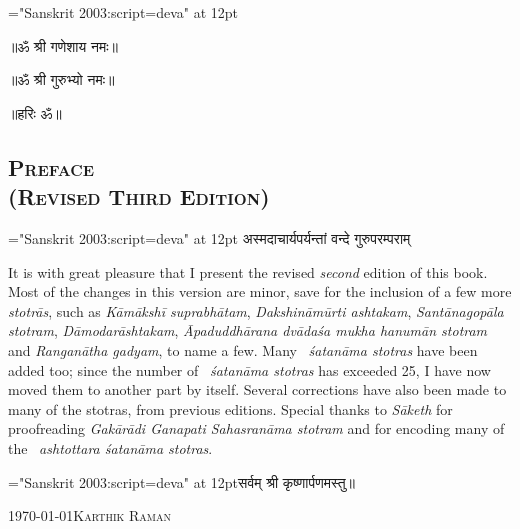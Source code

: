 {\font \x="Sanskrit 2003:script=deva" at 12pt\x
\centerline{॥ॐ श्री गणेशाय नमः॥}
\centerline{॥ॐ श्री गुरुभ्यो नमः॥}
\centerline{॥हरिः ॐ॥}
}
\thispagestyle{empty}

\begin{center}
\chapter*{\texorpdfstring{\scshape{Preface\\(Revised Third Edition)}}{Preface\\(Revised Third Edition)}}
\end{center}

{\font \x="Sanskrit 2003:script=deva" at 12pt\x
{}
{अस्मदाचार्यपर्यन्तां वन्दे गुरुपरम्पराम्}
}

It is with great pleasure that I present the revised \emph{second} edition of this book. Most of the changes in this version are minor, save for the inclusion of a few more \emph{stotrās}, such as \textit{Kāmākshī suprabhātam}, \textit{Dakshināmūrti ashtakam}, \textit{Santānagopāla stotram}, \textit{Dāmodarāshtakam}, \textit{Āpaduddhārana  dvādaśa mukha hanu\-mān stotram} and \textit{Ranganātha gadyam}, to name a few. Many ~\textit{śatanāma stotras} have been added too; since the number of ~\textit{śatanāma stotras} has exceeded 25, I have now moved them to another part by itself. Several corrections have also been made to many of the stotras, from previous editions. Special thanks to \textit{Sāketh} for proofreading \textit{Gakārādi Ganapati Sahasranāma stotram} and for encoding many of the ~\textit{ashtottara śatanāma stotras}.\\ 



\centerline{\font \x="Sanskrit 2003:script=deva" at 12pt\x सर्वम् श्री कृष्णार्पणमस्तु॥}

\medskip
\noindent\today \hfill \textsc{Karthik Raman}
